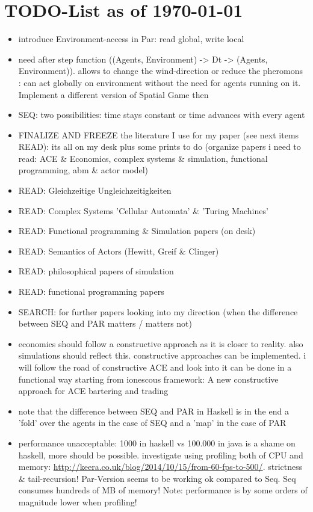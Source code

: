 \section{TODO-List as of \today}

\begin{itemize}
\item introduce Environment-access in Par: read global, write local

\item need after step function ((Agents, Environment) -> Dt -> (Agents, Environment)). allows to change the wind-direction or reduce the pheromons : can act globally on environment without the need for agents running on it. Implement a different version of Spatial Game then

\item SEQ: two possibilities: time stays constant or time advances with every agent

\item FINALIZE AND FREEZE the literature I use for my paper (see next items READ): its all on my desk plus some prints to do (organize papers i need to read: ACE & Economics, complex systems & simulation, functional programming, abm \& actor model)
\item READ: Gleichzeitige Ungleichzeitigkeiten
\item READ: Complex Systems 'Cellular Automata' \& 'Turing Machines'
\item READ: Functional programming \& Simulation papers (on desk)
\item READ: Semantics of Actors (Hewitt, Greif \& Clinger)
\item READ: philosophical papers of simulation
\item READ: functional programming papers
\item SEARCH: for further papers looking into my direction (when the difference between SEQ and PAR matters / matters not)

\item economics should follow a constructive approach as it is closer to reality. also simulations should reflect this. constructive approaches can be implemented. i will follow the road of constructive ACE and look into it can be done in a functional way starting from ionescous framework: A new constructive approach for  ACE bartering and trading

\item note that the difference between SEQ and PAR in Haskell is in the end a 'fold' over the agents in the case of SEQ and a 'map' in the case of PAR
\item performance unacceptable: 1000 in haskell vs 100.000 in java is a shame on haskell, more should be possible. investigate using profiling both of CPU and memory: \url{http://keera.co.uk/blog/2014/10/15/from-60-fps-to-500/}. strictness \& tail-recursion!
	Par-Version seems to be working ok compared to Seq. Seq consumes hundreds of MB of memory!
	Note: performance is by some orders of magnitude lower when profiling!


\end{itemize}

